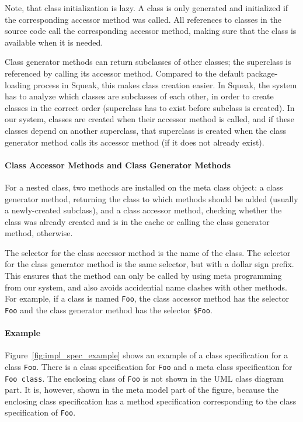 Note, that class initialization is lazy. A class is only generated and initialized if the corresponding accessor method was called. All references to classes in the source code call the corresponding accessor method, making sure that the class is available when it is needed. 

Class generator methods can return subclasses of other classes; the superclass is referenced by calling its accessor method. Compared to the default package-loading process in Squeak, this makes class creation easier. In Squeak, the system has to analyze which classes are subclasses of each other, in order to create classes in the correct order (superclass has to exist before subclass is created). In our system, classes are created when their accessor method is called, and if these classes depend on another superclass, that superclass is created when the class generator method calls its accessor method (if it does not already exist).

\paragraph{Class Accessor Methods and Class Generator Methods}
For a nested class, two methods are installed on the meta class object: a class generator method, returning the class to which methods should be added (usually a newly-created subclass), and a class accessor method, checking whether the class was already created and is in the cache or calling the class generator method, otherwise.

The selector for the class accessor method is the name of the class. The selector for the class generator method is the same selector, but with a dollar sign prefix. This ensures that the method can only be called by using meta programming from our system, and also avoids accidential name clashes with other methods. For example, if a class is named \texttt{Foo}, the class accessor method has the selector \texttt{Foo} and the class generator method has the selector \texttt{\$Foo}.

\paragraph{Example}
Figure~\ref{fig:impl_spec_example} shows an example of a class specification for a class \texttt{Foo}. There is a class specification for \texttt{Foo} and a meta class specification for \texttt{Foo class}. The enclosing class of \texttt{Foo} is not shown in the UML class diagram part. It is, however, shown in the meta model part of the figure, because the enclosing class specification has a method specification corresponding to the class specification of \texttt{Foo}.

